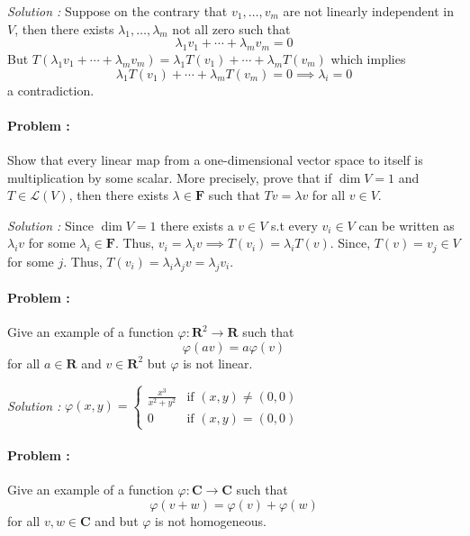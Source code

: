 \vspace{4mm}
\textit{Solution :} Suppose on the contrary that $v_1,\ldots,v_m$ are not linearly independent in $V$, then there exists 
$\lambda_1, \ldots, \lambda_m$ not all zero such that 
\[ \lambda_1 v_1 + \cdots + \lambda_m v_m = 0 \]  
But $T(\lambda_1 v_1 + \cdots + \lambda_m v_m)= \lambda_1 T(v_1) + \cdots + \lambda_m T(v_m)$ which implies
\[ \lambda_1 T(v_1) + \cdots + \lambda_m T(v_m) = 0 \implies \lambda_i = 0 \]
a contradiction.

\eject

\paragraph{Problem :} Show that every linear map from a one-dimensional vector space to itself is
multiplication by some scalar. More precisely, prove that if $\dim V = 1$ and
$T \in \mathcal{L}(V)$, then there exists $\lambda \in \mathbf{F}$ such that $Tv = \lambda v$ for all $v \in V$.

\vspace{4mm}
\textit{Solution :}
Since $\dim V = 1$ there exists a $v \in V$ s.t every $v_i \in V$ can be written as $\lambda_i v$ for some $\lambda_i \in \mathbf{F}$.
Thus, $v_i = \lambda_i v \implies T(v_i) = \lambda_i T(v)$. Since, $T(v) = v_j \in V$ for some $j$. 
Thus,  $T(v_i)=\lambda_i \lambda_j v = \lambda_j v_i$. 

\paragraph{Problem :} Give an example of a function $\varphi : \mathbf{R}^2 \to \mathbf{R}$ such that
\[ \varphi(av)= a \varphi(v) \]
for all $a \in \mathbf{R}$ and $v \in \mathbf{R}^2$ but $\varphi$ is not linear.

\vspace{4mm}
\textit{Solution :} $\varphi(x,y)=\begin{cases}
    \frac{x^3}{x^2+y^2} & \text{if } (x,y) \neq (0,0) \\
    0 & \text{if } (x,y)=(0,0)
\end{cases}$

\paragraph{Problem :} Give an example of a function $\varphi : \mathbf{C} \to \mathbf{C}$ such that
\[ \varphi(v+w)= \varphi(v)+\varphi(w) \]
for all $v,w \in \mathbf{C}$ and but $\varphi$ is not homogeneous.

